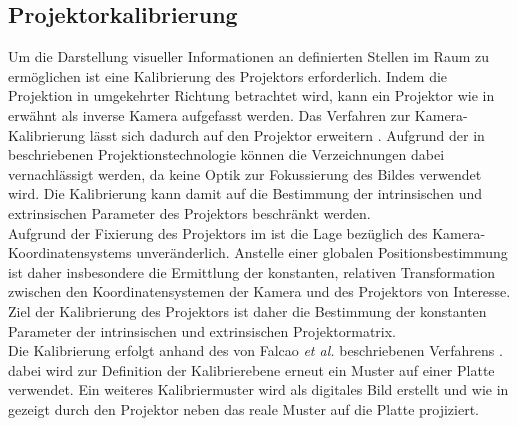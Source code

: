 


\subsection{Projektorkalibrierung}
Um die Darstellung visueller Informationen an definierten Stellen im Raum zu ermöglichen ist eine Kalibrierung des Projektors erforderlich. Indem die Projektion in umgekehrter Richtung betrachtet wird, kann ein Projektor wie in  erwähnt als inverse Kamera aufgefasst werden. Das Verfahren zur Kamera-Kalibrierung lässt sich dadurch auf den Projektor erweitern \cite{Falcao2008}. Aufgrund der in  beschriebenen Projektionstechnologie können die Verzeichnungen dabei vernachlässigt werden, da keine Optik zur Fokussierung des Bildes verwendet wird. Die Kalibrierung kann damit auf die Bestimmung der intrinsischen und extrinsischen Parameter des Projektors beschränkt werden.\\

Aufgrund der Fixierung des Projektors im \kps{} ist die Lage bezüglich des Kamera-Koordinatensystems unveränderlich. Anstelle einer globalen Positionsbestimmung ist daher insbesondere die Ermittlung der konstanten, relativen Transformation zwischen den Koordinatensystemen der Kamera und des Projektors von Interesse. Ziel der Kalibrierung des Projektors ist daher die Bestimmung der konstanten Parameter der intrinsischen und extrinsischen Projektormatrix.\\

Die Kalibrierung erfolgt anhand des von Falcao \textit{et al.} beschriebenen Verfahrens \cite{Falcao2008}. dabei wird zur Definition der Kalibrierebene erneut ein Muster auf einer Platte verwendet. Ein weiteres Kalibriermuster wird als digitales Bild erstellt und wie in  gezeigt durch den Projektor neben das reale Muster auf die Platte projiziert.

